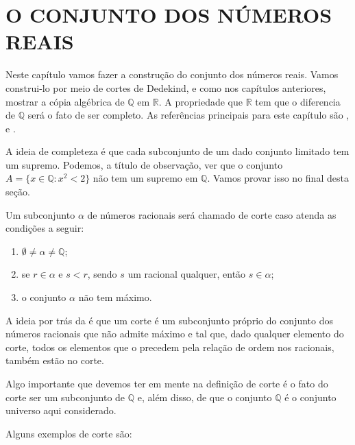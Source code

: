 \documentclass[../main.tex]{subfiles}
\begin{document}
\chapter{O CONJUNTO DOS NÚMEROS REAIS}\label{cap-reais}

Neste capítulo vamos fazer a construção do conjunto dos números reais. Vamos construi-lo por meio de cortes de Dedekind, e como nos capítulos anteriores, mostrar a cópia algébrica de $\mathbb{Q}$ em $\mathbb{R}$. A propriedade que $\mathbb{R}$ tem que o diferencia de $\mathbb{Q}$ será o fato de ser completo. As referências principais para este capítulo são \textcite{ferreira}, \textcite{domingues-2009} e \textcite{guidorizzi}.

A ideia de completeza é que cada subconjunto de um dado conjunto limitado tem um supremo. Podemos, a título de observação, ver que o conjunto 
$A = \{ x \in \mathbb{Q} : x^2 < 2\}$ não tem um supremo em $\mathbb{Q}$. Vamos provar isso no final desta seção.

\begin{defi}\label{reais-def-corte}
    Um subconjunto $\alpha$ de números racionais será chamado de corte caso atenda as condições a seguir:
    \begin{enumerate}[label=(\roman*)]
        \item\label{reais-def-corteSubconjuntoProprio} $\emptyset \neq \alpha \neq \mathbb{Q}$;
        \item\label{reais-def-cortePrecede} se $r \in \alpha$ e $s < r$, sendo $s$ um racional qualquer, então $s \in \alpha$;
        \item\label{reais-def-corteSemMaximo} o conjunto $\alpha$ não tem máximo.
    \end{enumerate}
\end{defi}

A ideia por trás da  é que um corte é um subconjunto próprio do conjunto dos números racionais que não admite máximo e tal que, dado qualquer elemento do corte, todos os elementos que o precedem pela relação de ordem nos racionais, também estão no corte.

\begin{obs}
    Algo importante que devemos ter em mente na definição de corte é o fato do corte ser um subconjunto de $\mathbb{Q}$ e, além disso, de que o conjunto $\mathbb{Q}$ é o conjunto universo aqui considerado.
\end{obs}

Alguns exemplos de corte são:
\end{document}
